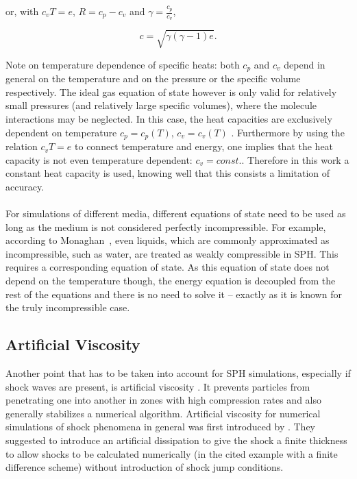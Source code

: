 \documentclass[11pt,a4paper,twoside]{report}
\begin{document}
or, with $c_v T=e$, $R=c_p-c_v$ and $\gamma=\frac{c_p}{c_v}$,

\begin{equation}
 c=\sqrt{\gamma(\gamma-1)e}.
\end{equation}

Note on temperature dependence of specific heats: both $c_p$ and $c_v$ depend in general on the temperature and on the pressure or the specific volume respectively. The ideal gas equation of state however is only valid for relatively small pressures (and relatively large specific volumes), where the molecule interactions may be neglected. In this case, the heat capacities are exclusively dependent on temperature $c_p=c_p(T)$, $c_v=c_v(T)$ \cite{White1974}. Furthermore by using the relation $c_v T=e$ to connect temperature and energy, one implies that the heat capacity is not even temperature dependent: $c_v=const.$. 
Therefore in this work a constant heat capacity is used, knowing well that this consists a limitation of accuracy.\\
\\
\indent
For simulations of different media, different equations of state need to be used as long as the medium is not considered perfectly incompressible. For example, according to Monaghan~\cite{Monaghan1994,Monaghan2005}, even liquids, which are commonly approximated as incompressible, such as water, are treated as weakly compressible in SPH. This requires a corresponding equation of state. As this equation of state does not depend on the temperature though, the energy equation is decoupled from the rest of the equations and there is no need to solve it -- exactly as it is known for the truly incompressible case.

\subsection{Artificial Viscosity}
\label{sec:ArtVisc}

Another point that has to be taken into account for SPH simulations, especially
if shock waves are present, is artificial viscosity \cite{Monaghan2005}. It
prevents particles from penetrating one into another in zones with high
compression rates and also generally stabilizes a numerical
algorithm.
Artificial viscosity for numerical simulations of shock phenomena
in general was first introduced by \cite{vonNeumann1950}. They suggested to
introduce an artificial dissipation to give the shock a finite thickness to 
allow shocks to be calculated numerically (in the cited example with a finite difference scheme) without introduction of shock jump conditions.
\end{document}
